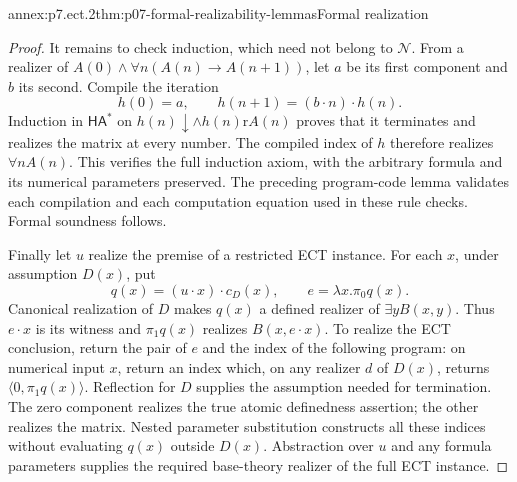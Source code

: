 \begin{annexitem}{annex:p7.ect.2}{thm:p07-formal-realizability-lemmas}{Formal realization}
\begin{proof}
It remains to check induction, which need not belong to
\(\mathcal N\). From a realizer of
\(A(0)\land\forall n(A(n)\to A(n+1))\), let \(a\) be
its first component and \(b\) its second. Compile the iteration
\[
 h(0)=a,\qquad
 h(n+1)=(b\mathbin{\cdot}n)\mathbin{\cdot}h(n).
\]
Induction in \(\mathsf{HA}^{\ast}\) on
\(h(n)\downarrow\land h(n)\mathrel{\mathrm r}A(n)\)
proves that it terminates and realizes the matrix at every number.
The compiled index of \(h\) therefore realizes \(\forall nA(n)\).
This verifies the full induction axiom, with the arbitrary formula
and its numerical parameters preserved. The preceding program-code
lemma validates each compilation and each computation equation used
in these rule checks. Formal soundness follows.

Finally let \(u\) realize the premise of a restricted ECT instance.
For each \(x\), under assumption \(D(x)\), put
\[
 q(x)=(u\mathbin{\cdot}x)\mathbin{\cdot}c_D(x),
 \qquad e=\lambda x.\pi_0q(x).
\]
Canonical realization of \(D\) makes \(q(x)\) a defined realizer
of \(\exists yB(x,y)\). Thus \(e\mathbin{\cdot}x\) is its
witness and \(\pi_1q(x)\) realizes \(B(x,e\mathbin{\cdot}x)\).
To realize the ECT conclusion, return the pair of \(e\) and the
index of the following program: on numerical input \(x\), return
an index which, on any realizer \(d\) of \(D(x)\), returns
\(\langle0,\pi_1q(x)\rangle\).
Reflection for \(D\) supplies the assumption needed for termination.
The zero component realizes the true atomic definedness assertion;
the other realizes the matrix. Nested parameter substitution constructs
all these indices without evaluating \(q(x)\) outside \(D(x)\).
Abstraction over \(u\) and any formula parameters supplies the
required base-theory realizer of the full ECT instance.
\end{proof}
\end{annexitem}

